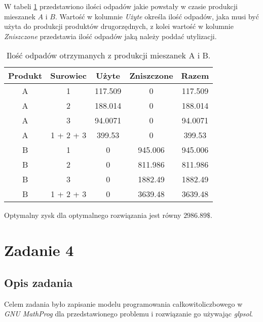 \documentclass{article}
\begin{document}
        W tabeli \ref{tab4} przedstawiono ilości odpadów jakie powstały w czasie produkcji mieszanek $A$ i $B$. Wartość w kolumnie \textit{Użyte} określa 
        ilość odpadów, jaka musi być użyta do produkcji produktów drugorzędnych, z kolei wartość w kolumnie \textit{Zniszczone} przedstawia ilość odpadów 
        jaką należy poddać utylizacji. 

        \begin{table}[H]
            \begin{center}
                \begin{tabular}{c|c||c|c|c}
                    \textbf{Produkt} & \textbf{Surowiec} & \textbf{Użyte} & \textbf{Zniszczone} & \textbf{Razem} \\ 
                    \hline
                    A   & 1   & 117.509   & 0   & 117.509 \\ 
                    A   & 2   & 188.014   & 0   & 188.014 \\ 
                    A   & 3   & 94.0071   & 0   & 94.0071 \\ 
                    A   & 1 + 2 + 3   & 399.53   & 0   & 399.53 \\ 
                    \hline
                    B   & 1   & 0   & 945.006   & 945.006 \\ 
                    B   & 2   & 0   & 811.986   & 811.986 \\ 
                    B   & 3   & 0   & 1882.49   & 1882.49 \\ 
                    B   & 1 + 2 + 3   & 0   & 3639.48   & 3639.48 \\
                \end{tabular}
                \caption{Ilość odpadów otrzymanych z produkcji mieszanek A i B.}
                \label{tab4}
            \end{center}
        \end{table}

        Optymalny zysk dla optymalnego rozwiązania jest równy $2986.89\$$.

    \section{Zadanie 4}
	\subsection{Opis zadania}

        Celem zadania było zapisanie modelu programowania całkowitoliczbowego w \textit{GNU MathProg} dla przedstawionego problemu i rozwiązanie go 
        używając \textit{glpsol}.
\end{document}
